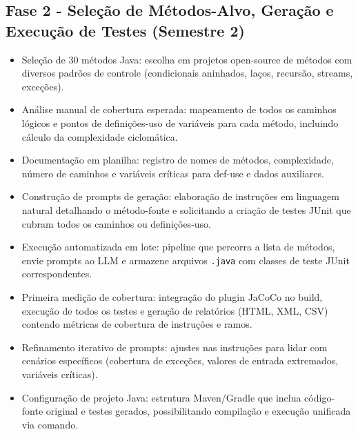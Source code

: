     \subsection{Fase 2 - Seleção de Métodos-Alvo, Geração e Execução de Testes (Semestre 2)}
        \begin{itemize}
            \item Seleção de 30 métodos Java: escolha em projetos open-source de métodos com diversos padrões de controle (condicionais aninhados, laços, recursão, streams, exceções).
            \item Análise manual de cobertura esperada: mapeamento de todos os caminhos lógicos e pontos de definições-uso de variáveis para cada método, incluindo cálculo da complexidade ciclomática.
            \item Documentação em planilha: registro de nomes de métodos, complexidade, número de caminhos e variáveis críticas para def-use e dados auxiliares.
            \item Construção de prompts de geração: elaboração de instruções em linguagem natural detalhando o método-fonte e solicitando a criação de testes JUnit que cubram todos os caminhos ou definições-uso.
            \item Execução automatizada em lote: pipeline que percorra a lista de métodos, envie prompts ao LLM e armazene arquivos \texttt{.java} com classes de teste JUnit correspondentes.
            \item Primeira medição de cobertura: integração do plugin JaCoCo no build, execução de todos os testes e geração de relatórios (HTML, XML, CSV) contendo métricas de cobertura de instruções e ramos.
            \item Refinamento iterativo de prompts: ajustes nas instruções para lidar com cenários específicos (cobertura de exceções, valores de entrada extremados, variáveis críticas).
            \item Configuração de projeto Java: estrutura Maven/Gradle que inclua código-fonte original e testes gerados, possibilitando compilação e execução unificada via comando.
        \end{itemize}
